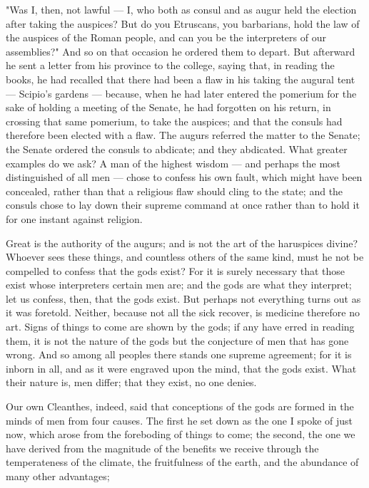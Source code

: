  "Was I, then, not lawful — I, who both as consul and as augur held the election after taking the auspices? But do you Etruscans, you barbarians, hold the law of the auspices of the Roman people, and can you be the interpreters of our assemblies?" And so on that occasion he ordered them to depart. But afterward he sent a letter from his province to the college, saying that, in reading the books, he had recalled that there had been a flaw in his taking the augural tent — Scipio's gardens — because, when he had later entered the pomerium for the sake of holding a meeting of the Senate, he had forgotten on his return, in crossing that same pomerium, to take the auspices; and that the consuls had therefore been elected with a flaw. The augurs referred the matter to the Senate; the Senate ordered the consuls to abdicate; and they abdicated. What greater examples do we ask? A man of the highest wisdom — and perhaps the most distinguished of all men — chose to confess his own fault, which might have been concealed, rather than that a religious flaw should cling to the state; and the consuls chose to lay down their supreme command at once rather than to hold it for one instant against religion.

 Great is the authority of the augurs; and is not the art of the haruspices divine? Whoever sees these things, and countless others of the same kind, must he not be compelled to confess that the gods exist? For it is surely necessary that those exist whose interpreters certain men are; and the gods are what they interpret; let us confess, then, that the gods exist. But perhaps not everything turns out as it was foretold. Neither, because not all the sick recover, is medicine therefore no art. Signs of things to come are shown by the gods; if any have erred in reading them, it is not the nature of the gods but the conjecture of men that has gone wrong. And so among all peoples there stands one supreme agreement; for it is inborn in all, and as it were engraved upon the mind, that the gods exist. What their nature is, men differ; that they exist, no one denies.

 Our own Cleanthes, indeed, said that conceptions of the gods are formed in the minds of men from four causes. The first he set down as the one I spoke of just now, which arose from the foreboding of things to come; the second, the one we have derived from the magnitude of the benefits we receive through the temperateness of the climate, the fruitfulness of the earth, and the abundance of many other advantages;

